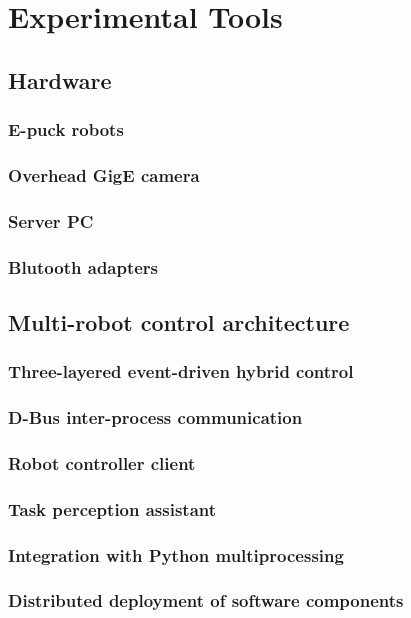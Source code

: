 \chapter{Experimental Tools}
\section{Hardware}
\subsection{E-puck robots}
\subsection{Overhead GigE camera}
\subsection{Server PC}
\subsection{Blutooth adapters}
\section{Multi-robot control architecture}
\subsection{Three-layered event-driven hybrid control}
\subsection{D-Bus inter-process communication}
\subsection{Robot controller client}
\subsection{Task perception assistant}
\subsection{Integration with Python multiprocessing}
\subsection{Distributed deployment of software components}
